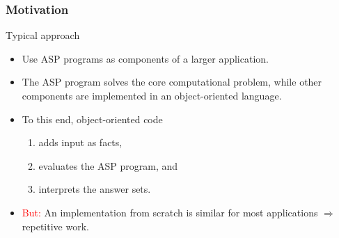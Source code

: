 \documentclass[%
beamer,%
english,%
10pt,%
]{beamer}
\newcommand{\blue}[1]{{\color{blue}#1}}
\begin{document}
\begin{frame}
    \frametitle{Motivation}

    \begin{block}{Typical approach}
        \begin{itemize}
            \item Use ASP programs as \blue{components of a larger application}.
            \bigskip
            \item The ASP program solves the \blue{core computational problem}, while other components are implemented in an \blue{object-oriented language}.
            \bigskip
            \item To this end, object-oriented code
                \begin{enumerate}
                    \item adds input as facts,
                    \item evaluates the ASP program, and
                    \item interprets the answer sets.
                \end{enumerate}
            \bigskip
            \item \textcolor{red}{But:} An implementation from scratch is similar for most applications $\Rightarrow$ repetitive work.
        \end{itemize}
    \end{block}
\end{frame}
\end{document}
